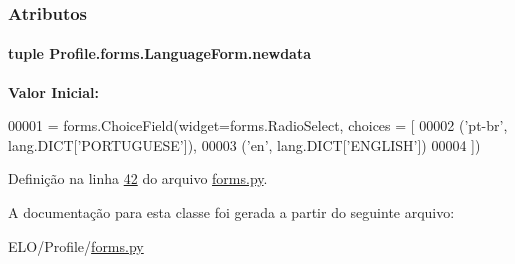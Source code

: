 \subsubsection{Atributos}
\hypertarget{classProfile_1_1forms_1_1LanguageForm_a327d764765fba9b8d9d82c86ca7e08a6}{
\paragraph[{newdata}]{\setlength{\rightskip}{0pt plus 5cm}tuple Profile.\-forms.\-Language\-Form.\-newdata\hspace{0.3cm}{\ttfamily [static]}}}\label{classProfile_1_1forms_1_1LanguageForm_a327d764765fba9b8d9d82c86ca7e08a6}
{\bfseries Valor Inicial\-:}
\begin{DoxyCode}
00001 = forms.ChoiceField(widget=forms.RadioSelect, choices = [
00002                                             (\textcolor{stringliteral}{'pt-br'}, lang.DICT[\textcolor{stringliteral}{'PORTUGUESE'}]),
00003                                             (\textcolor{stringliteral}{'en'}, lang.DICT[\textcolor{stringliteral}{'ENGLISH'}])
00004                                                 ])
\end{DoxyCode}


Definição na linha \hyperlink{Profile_2forms_8py_source_l00042}{42} do arquivo \hyperlink{Profile_2forms_8py_source}{forms.\-py}.



A documentação para esta classe foi gerada a partir do seguinte arquivo\-:\begin{DoxyCompactItemize}
\item 
E\-L\-O/\-Profile/\hyperlink{Profile_2forms_8py}{forms.\-py}\end{DoxyCompactItemize}
